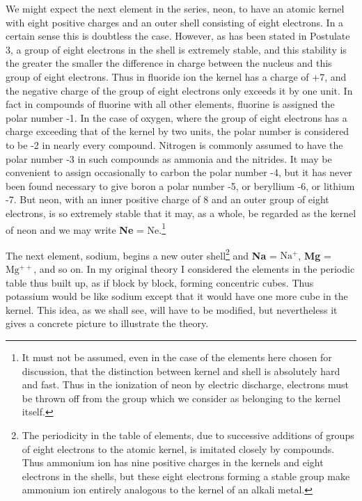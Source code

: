 \documentclass[11pt]{memoir}
\begin{document}
We might expect the next element in the series, neon, to have an atomic kernel with eight positive charges and an outer shell consisting of eight electrons.  In a certain sense this is doubtless the case.  However, as has been stated in Postulate 3, a group of eight electrons in the shell is extremely stable, and this stability is the greater the smaller the difference in charge between the nucleus and this group of eight electrons.  Thus in fluoride ion the kernel has a charge of +7, and the negative charge of the group of eight electrons only exceeds it by one unit.  In fact in compounds of fluorine with all other elements, fluorine is assigned the polar number -1.  In the case of oxygen, where the group of eight electrons has a charge exceeding that of the kernel by two units, the polar number is considered to be -2 in nearly every compound.  Nitrogen is commonly assumed to have the polar number -3 in such compounds as ammonia and the nitrides.  It may be convenient to assign occasionally to carbon the polar number -4, but it has never been found necessary to give boron a polar number -5, or beryllium -6, or lithium -7.  But neon, with an inner positive charge of 8 and an outer group of eight electrons, is so extremely stable that it may, as a whole, be regarded as the kernel of neon and we may write \textbf{Ne} = Ne.\footnote{It must not be assumed, even in the case of the elements here chosen for discussion, that the distinction between kernel and shell is absolutely hard and fast.  Thus in the ionization of neon by electric discharge, electrons must be thrown off from the group which we consider as belonging to the kernel itself.}

The next element, sodium, begins a new outer shell\footnote{The periodicity in the table of elements, due to successive additions of groups of eight electrons to the atomic kernel, is imitated closely by compounds.  Thus ammonium ion has nine positive charges in the kernels and eight electrons in the shells, but these eight electrons forming a stable group make ammonium ion entirely analogous to the kernel of an alkali metal.} and \textbf{Na} = $\mathrm{Na^+}$, \textbf{Mg} = $\mathrm{Mg^{++}}$, and so on.  In my original theory I considered the elements in the periodic table thus built up, as if block by block, forming concentric cubes.  Thus potassium would be like sodium except that it would have one more cube in the kernel.  This idea, as we shall see, will have to be modified, but nevertheless it gives a concrete picture to illustrate the theory.
\end{document}
